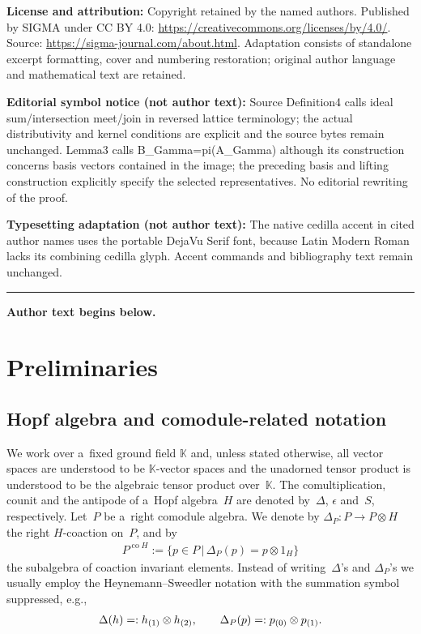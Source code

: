 \documentclass[11pt]{article}
\DeclareMathOperator{\co}{co}
\def\sw#1{{\sb{(#1)}}}
\begin{document}
\noindent\textbf{License and attribution:} Copyright retained by the named authors. Published by SIGMA under CC BY 4.0: \url{https://creativecommons.org/licenses/by/4.0/}. Source: \url{https://sigma-journal.com/about.html}. Adaptation consists of standalone excerpt formatting, cover and numbering restoration; original author language and mathematical text are retained.\par
\noindent\textbf{Editorial symbol notice (not author text):} Source Definition4 calls ideal sum/intersection meet/join in reversed lattice terminology; the actual distributivity and kernel conditions are explicit and the source bytes remain unchanged. Lemma3 calls B\_Gamma=\allowbreak{}pi(A\_Gamma) although its construction concerns basis vectors contained in the image; the preceding basis and lifting construction explicitly specify the selected representatives. No editorial rewriting of the proof.\par
\noindent\textbf{Typesetting adaptation (not author text):} The native cedilla accent in cited author names uses the portable DejaVu Serif font, because Latin Modern Roman lacks its combining cedilla glyph. Accent commands and bibliography text remain unchanged.\par
\medskip\hrule\medskip\noindent\textbf{Author text begins below.}\par
\setcounter{section}{1}
\setcounter{subsection}{0}
\setcounter{subsubsection}{0}
\setcounter{equation}{0}
\section{Preliminaries}\label{preliminaries}

\subsection{Hopf algebra and comodule-related notation}

We work over a~f\/ixed ground f\/ield $\mathbb{K}$ and, unless stated otherwise, all vector spaces are understood to be
$\mathbb{K}$-vector spaces and the unadorned tensor product is understood to be the algebraic tensor product over~$\mathbb{K}$.
The comultiplication, counit and the antipode of a~Hopf algebra~$H$ are denoted by~$\Delta$, ${\epsilon}$ and~$S$,
respectively.
Let~$P$ be a~right comodule algebra.
We denote by $\Delta_P:P\rightarrow P\otimes H$ the right $H$-coaction on~$P$, and by
\begin{gather*}
P^{\co H}:=\big\{p\in P
\,|\,
\Delta_P(p)=p\otimes 1_H\big\}
\end{gather*}
the subalgebra of coaction invariant elements.
Instead of writing~$\Delta$'s and $\Delta_P$'s we usually employ the Heynemann--Sweedler notation with the summation
symbol suppressed, e.g.,
\begin{gather*}
\Delta(h)=:h\sw{1}\otimes h\sw{2},
\qquad
\Delta_P(p)=:p\sw{0}\otimes p\sw{1}.
\end{gather*}
\end{document}
